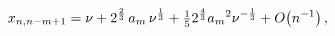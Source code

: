\[x_{n,n-m+1}=\nu+2^{\frac{2}{3}}\mathop{a_{m}\/}\nolimits\nu^{\frac{1}{3}}+%
\tfrac{1}{5}2^{\frac{4}{3}}{\mathop{a_{m}\/}\nolimits^{2}}\nu^{-\frac{1}{3}}+%
\mathop{O\/}\nolimits\!\left(n^{-1}\right),\]